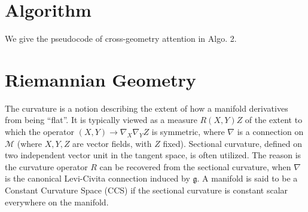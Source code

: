 \vspace{-0.05in}
\section{Algorithm}

We give the pseudocode of cross-geometry attention in Algo. 2. 


\vspace{-0.07in}
\section{Riemannian Geometry}
The curvature is a notion describing the extent of how a manifold derivatives from being ``flat''. 
It is typically viewed as a measure $R(X, Y)Z$ of the extent to which the operator 
$(X,Y) \to \nabla_X \nabla_YZ$ is symmetric, where $\nabla$ is a connection on $\mathcal M$ (where $X, Y, Z$ are vector fields, with $Z$ fixed).
Sectional curvature, defined on two independent vector unit in the tangent space, is often utilized.
The reason is the curvature operator $R$ can be recovered from the sectional curvature, when $\nabla$ is the canonical Levi-Civita connection induced by $\mathfrak g$.
A manifold is said to be a Constant Curvature Space (CCS) if the sectional curvature is constant scalar everywhere on the manifold.

